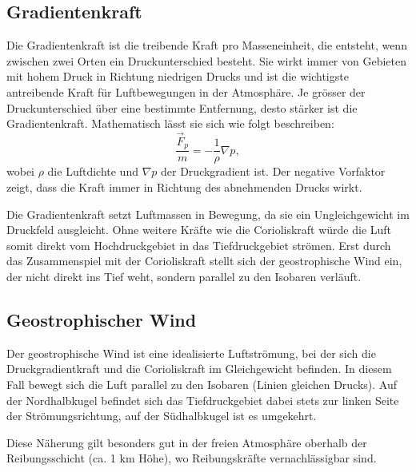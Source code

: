 \subsection{Gradientenkraft
\label{geostrophisch:subsection:gradient}}
Die Gradientenkraft ist die treibende Kraft pro Masseneinheit, die entsteht, wenn zwischen zwei Orten ein Druckunterschied besteht. Sie wirkt immer von Gebieten mit hohem Druck in Richtung niedrigen Drucks und ist die wichtigste antreibende Kraft für Luftbewegungen in der Atmosphäre. Je grösser der Druckunterschied über eine bestimmte Entfernung, desto stärker ist die Gradientenkraft.
Mathematisch lässt sie sich wie folgt beschreiben:
\begin{equation}
\frac{\vec{F}_p} {m}
= 
-\frac{1}{\rho} \nabla p
\label{geostrophisch:equation4},
\end{equation}
wobei $\rho$ die Luftdichte und $\nabla p$ der Druckgradient ist. 
Der negative Vorfaktor zeigt, dass die Kraft immer in Richtung des abnehmenden Drucks wirkt.

Die Gradientenkraft setzt Luftmassen in Bewegung, da sie ein Ungleichgewicht im Druckfeld ausgleicht. Ohne weitere Kräfte wie die Corioliskraft würde die Luft somit direkt vom Hochdruckgebiet in das Tiefdruckgebiet strömen. Erst durch das Zusammenspiel mit der Corioliskraft stellt sich der geostrophische Wind ein, der nicht direkt ins Tief weht, sondern parallel zu den Isobaren verläuft.

\subsection{Geostrophischer Wind}

Der geostrophische Wind ist eine idealisierte Luftströmung, bei der sich die Druckgradientkraft und die Corioliskraft im Gleichgewicht befinden. In diesem Fall bewegt sich die Luft parallel zu den Isobaren (Linien gleichen Drucks). Auf der Nordhalbkugel befindet sich das Tiefdruckgebiet dabei stets zur linken Seite der Strömungsrichtung, auf der Südhalbkugel ist es umgekehrt.

Diese Näherung gilt besonders gut in der freien Atmosphäre oberhalb der Reibungsschicht (ca. 1 km Höhe), wo Reibungskräfte vernachlässigbar sind. 


